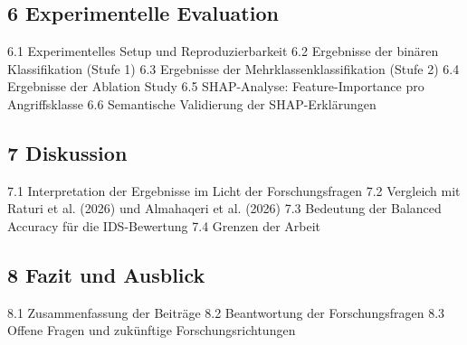 \subsection{6 Experimentelle Evaluation}
6.1 Experimentelles Setup und Reproduzierbarkeit
6.2 Ergebnisse der binären Klassifikation (Stufe 1)
6.3 Ergebnisse der Mehrklassenklassifikation (Stufe 2)
6.4 Ergebnisse der Ablation Study
6.5 SHAP-Analyse: Feature-Importance pro Angriffsklasse
6.6 Semantische Validierung der SHAP-Erklärungen

\subsection{7 Diskussion}
7.1 Interpretation der Ergebnisse im Licht der Forschungsfragen
7.2 Vergleich mit Raturi et al. (2026) und Almahaqeri et al. (2026)
7.3 Bedeutung der Balanced Accuracy für die IDS-Bewertung
7.4 Grenzen der Arbeit

\subsection{8 Fazit und Ausblick}
8.1 Zusammenfassung der Beiträge
8.2 Beantwortung der Forschungsfragen
8.3 Offene Fragen und zukünftige Forschungsrichtungen
